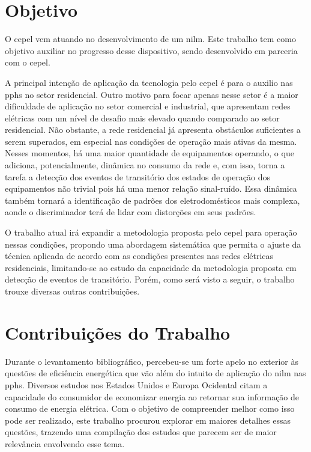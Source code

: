 \section{Objetivo}

O \acs{cepel} vem atuando no desenvolvimento de um \acs{nilm}. Este
trabalho tem como objetivo auxiliar no progresso desse dispositivo,
sendo desenvolvido em parceria com o \acs{cepel}.

A principal intenção de aplicação da tecnologia pelo \acs{cepel} é
para o auxilio nas \glspl{pph} no setor residencial. Outro motivo para
focar apenas nesse setor é a maior dificuldade de aplicação no setor
comercial e industrial, que apresentam redes elétricas com um nível de
desafio mais elevado quando comparado ao setor residencial. Não
obstante, a rede residencial já apresenta obstáculos suficientes a
serem superados, em especial nas condições de operação mais ativas da
mesma. Nesses momentos, há uma maior quantidade de equipamentos
operando, o que adiciona, potencialmente, dinâmica no consumo da rede
e, com isso, torna a tarefa a detecção dos eventos de transitório
dos estados de operação dos equipamentos não trivial pois há uma menor
relação sinal-ruído. Essa dinâmica também tornará a identificação de
padrões dos eletrodomésticos mais complexa, aonde o discriminador terá
de lidar com distorções em seus padrões. 

O trabalho atual irá expandir a metodologia proposta pelo \acs{cepel}
para operação nessas condições, propondo uma abordagem sistemática que
permita o ajuste da técnica aplicada de acordo com as condições
presentes nas redes elétricas residenciais, limitando-se ao estudo da
capacidade da metodologia proposta em detecção de eventos de
transitório. Porém, como será visto a seguir, o trabalho trouxe
diversas outras contribuições.

\section{Contribuições do Trabalho}

Durante o levantamento bibliográfico, percebeu-se um forte apelo no
exterior às questões de eficiência energética que vão além do intuito
de aplicação do \acs{nilm} nas \glspl{pph}. Diversos estudos nos
Estados Unidos e Europa Ocidental citam a capacidade do consumidor de
economizar energia ao retornar sua informação de consumo de energia
elétrica. Com o objetivo de compreender melhor como isso pode ser
realizado, este trabalho procurou explorar em maiores detalhes essas
questões, trazendo uma compilação dos estudos que parecem ser de maior
relevância envolvendo esse tema.

